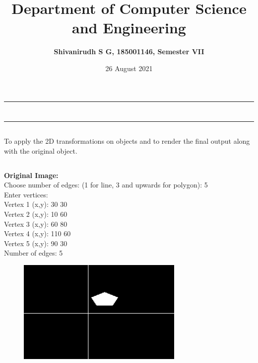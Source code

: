 \documentclass[9pt,letterpaper]{article}
\title{\textbf{Department of Computer Science and Engineering}}
\author{\textbf{Shivanirudh S G, 185001146, Semester VII }}
\date{26 August 2021}
\begin{document}
\maketitle
\hrule
\section*{}
\hrule 
\bigskip\bigskip

\subsection*{}

\subsection*{}
\begin{flushleft}
     To apply the 2D transformations on objects and to render the final output along with the original object.  
\end{flushleft}

\subsection*{}
\begin{flushleft}




\end{flushleft}
\newpage
\subsection*{}
\textbf{Original Image:}\\
Choose number of edges: (1 for line, 3 and upwards for polygon): 5\\
Enter vertices:\\ 
Vertex 1 (x,y): 30 30\\
Vertex 2 (x,y): 10 60\\
Vertex 3 (x,y): 60 80\\
Vertex 4 (x,y): 110 60\\
Vertex 5 (x,y): 90 30\\
Number of edges: 5\\
\begin{figure}[h]
    \centering
    \includegraphics[height=5cm]{Outputs/OP1.png}
\end{figure}
\end{document}
